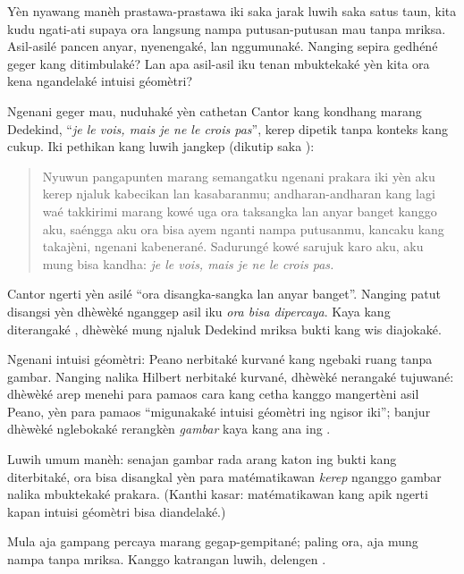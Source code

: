 \documentclass[../../../include/open-logic-section]{subfiles}
\begin{document}


Yèn nyawang manèh prastawa-prastawa iki
saka jarak luwih saka satus taun,
kita kudu ngati-ati supaya ora
langsung nampa putusan-putusan
mau tanpa mriksa. Asil-asilé
pancen anyar, nyenengaké, lan
nggumunaké. Nanging sepira
gedhéné geger kang ditimbulaké?
Lan apa asil-asil iku tenan
mbuktekaké yèn kita ora
kena ngandelaké intuisi géomètri?

Ngenani geger mau, \citet{Gouvea2011}
nuduhaké yèn cathetan Cantor kang
kondhang marang Dedekind,
``\emph{je le vois, mais je ne le crois
pas}'', kerep dipetik tanpa
konteks kang cukup. Iki
pethikan kang luwih jangkep
(dikutip saka \citeauthor{Gouvea2011}):
\begin{quote}
Nyuwun pangapunten marang semangatku
ngenani prakara iki yèn aku kerep
njaluk kabecikan lan kasabaranmu;
andharan-andharan kang lagi waé takkirimi
marang kowé uga ora taksangka
lan anyar banget kanggo aku,
saéngga aku ora bisa ayem
nganti nampa putusanmu,
kancaku kang takajèni,
ngenani kabenerané.
Sadurungé kowé sarujuk
karo aku, aku mung
bisa kandha:
\emph{je le vois, mais je ne le crois pas.}
\end{quote}
Cantor ngerti yèn asilé ``ora
disangka-sangka lan anyar banget''.
Nanging patut disangsi yèn dhèwèké
nganggep asil iku \emph{ora bisa
dipercaya}. Kaya kang diterangaké
\citeauthor{Gouvea2011}, dhèwèké
mung njaluk Dedekind mriksa
bukti kang wis diajokaké.

Ngenani intuisi géomètri: Peano
nerbitaké kurvané kang ngebaki
ruang tanpa gambar. Nanging
nalika Hilbert nerbitaké kurvané,
dhèwèké nerangaké tujuwané:
dhèwèké arep menehi para
pamaos cara kang cetha kanggo
mangertèni asil Peano,
yèn para pamaos ``migunakaké
intuisi géomètri ing ngisor
iki''; banjur dhèwèké
nglebokaké rerangkèn
\emph{gambar} kaya kang
ana ing
.

Luwih umum manèh: senajan
gambar rada arang katon
ing bukti kang diterbitaké,
ora bisa disangkal yèn
para matématikawan
\emph{kerep} nganggo
gambar nalika mbuktekaké
prakara. (Kanthi kasar:
matématikawan kang apik
ngerti kapan intuisi
géomètri bisa diandelaké.)

Mula aja gampang percaya marang
gegap-gempitané; paling ora,
aja mung nampa tanpa mriksa.
Kanggo katrangan luwih,
delengen \citet{Giaquinto2007}.
\end{document}
